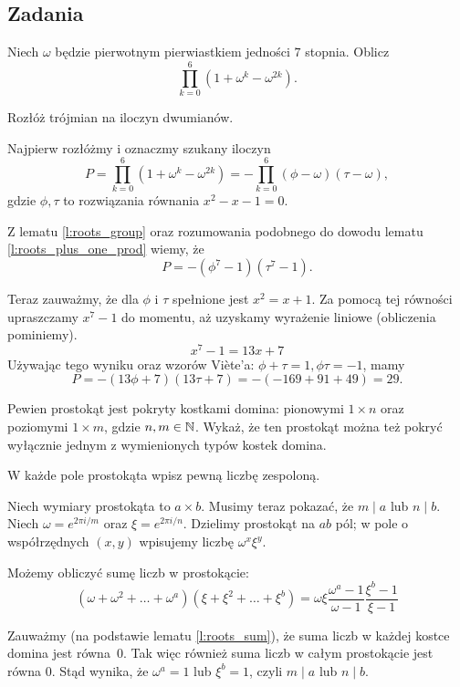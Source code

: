 \documentclass{scrartcl}
\begin{document}
    \subsection{Zadania}
    \begin{problem}
        Niech $\omega$ będzie pierwotnym pierwiastkiem jedności $7$ stopnia. Oblicz
        $$ \prod_{k = 0}^6(1 + \omega^k - \omega^{2k}). $$
        \begin{hint}
            Rozłóż trójmian na iloczyn dwumianów.
        \end{hint}
        \begin{answer}
            Najpierw rozłóżmy i oznaczmy szukany iloczyn
            $$ P = \prod_{k = 0}^6(1 + \omega^k - \omega^{2k}) = -\prod_{k = 0}^6(\phi - \omega)(\tau - \omega), $$
            gdzie $\phi, \tau$ to rozwiązania równania $x^2 - x - 1 = 0$.

            Z lematu \ref{l:roots_group} oraz rozumowania podobnego do dowodu lematu \ref{l:roots_plus_one_prod} wiemy, że
            $$ P = -(\phi^7 - 1)(\tau^7 - 1). $$

            Teraz zauważmy, że dla $\phi$ i $\tau$ spełnione jest $x^2 = x + 1$. Za pomocą tej równości upraszczamy $x^7 - 1$ do momentu, aż uzyskamy wyrażenie liniowe (obliczenia pominiemy).
            $$ x^7 - 1 = 13x + 7 $$
            Używając tego wyniku oraz wzorów Viète'a: $\phi + \tau = 1, \phi\tau = -1$, mamy
            $$ P = -(13\phi + 7)(13\tau + 7) = -(-169 + 91 + 49) = 29. $$
        \end{answer}
    \end{problem}

    \begin{problem}
        Pewien prostokąt jest pokryty kostkami domina: pionowymi $1 \times n$ oraz poziomymi $1 \times m$, gdzie $n, m \in \mathbb N$. Wykaż, że ten prostokąt można też pokryć wyłącznie jednym z wymienionych typów kostek domina.
        \begin{hint}
            W każde pole prostokąta wpisz pewną liczbę zespoloną.
        \end{hint}
        \begin{answer}
            Niech wymiary prostokąta to $a \times b$. Musimy teraz pokazać, że $m \mid a$ lub $n \mid b$. Niech $\omega = e^{2\pi i/m}$ oraz $\xi = e^{2\pi i/n}$. Dzielimy prostokąt na $ab$ pól; w pole o współrzędnych $(x, y)$ wpisujemy liczbę $\omega^x\xi^y$.

            Możemy obliczyć sumę liczb w prostokącie:
            $$ (\omega + \omega^2 + \ldots + \omega^a)(\xi + \xi^2 + \ldots + \xi^b) = \omega\xi\frac{\omega^a - 1}{\omega - 1}\frac{\xi^b - 1}{\xi - 1} $$

            Zauważmy (na podstawie lematu \ref{l:roots_sum}), że suma liczb w każdej kostce domina jest równa~$0$. Tak więc również suma liczb w całym prostokącie jest równa $0$. Stąd wynika, że $\omega^a = 1$ lub $\xi^b = 1$, czyli $m \mid a$ lub $n \mid b$.
        \end{answer}
    \end{problem}
\end{document}
